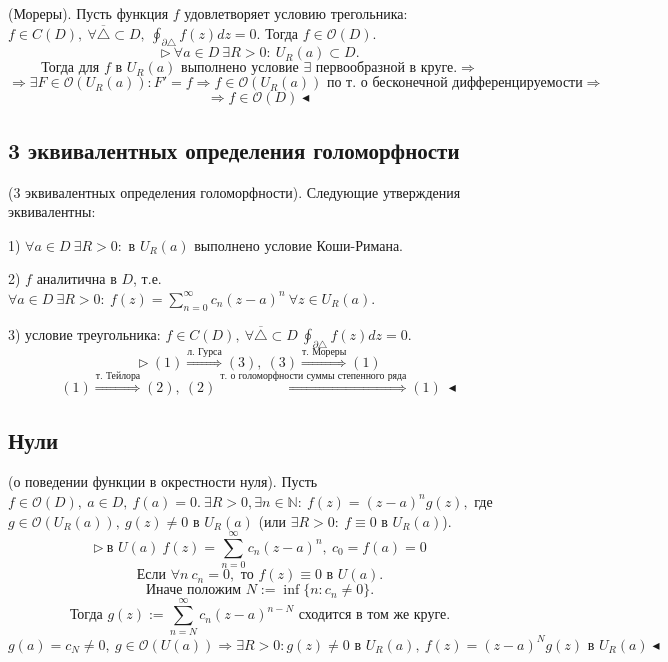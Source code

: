  (Мореры). Пусть функция $f$ удовлетворяет условию трегольника: $f \in C(D), \ \forall \overline{\triangle} \subset D, \ \oint_{\partial \triangle} f(z) dz = 0.$ Тогда $f \in \mathcal{O}(D).$
\[\triangleright \ \forall a \in D \ \exists R>0: \ U_R(a) \subset D.\] 
\[\text{Тогда для $f$ в } U_R(a) \text{ выполнено условие $\exists$ первообразной в круге.} \Rightarrow\] 
\[\Rightarrow \exists F \in \mathcal{O}(U_R(a)) : F' = f \Rightarrow f \in \mathcal{O}(U_R(a)) \text{ по т. о бесконечной дифференцируемости} \Rightarrow\]
\[\Rightarrow  f \in \mathcal{O}(D) \blacktriangleleft\]
\subsection{3 эквивалентных определения голоморфности}
 (3 эквивалентных определения голоморфности). Следующие утверждения эквивалентны:

1) $\forall a \in D \ \exists R > 0 :$ в $U_R(a)$ выполнено условие Коши-Римана.

2) $f$ аналитична в $D$, т.е. $\forall a \in D \ \exists R > 0: \ f(z) = \sum_{n=0}^\infty c_n(z-a)^n \ \forall z \in U_R(a)$.

3) условие треугольника: $f \in C(D), \ \forall \overline{\triangle} \subset D \ \oint_{\partial \triangle} f(z) dz = 0.$
\[\triangleright \ (1) \overset{\text{л. Гурса}}{\Rightarrow} (3), \ (3) \overset{\text{т. Мореры}}{\Rightarrow} (1)\]
\[(1) \overset{\text{т. Тейлора}}{\Rightarrow} (2), \ (2) \overset{\text{т. о голоморфности суммы степенного ряда}}{\Rightarrow} (1) \ \blacktriangleleft\]

\subsection{Нули}
 (о поведении функции в окрестности нуля). Пусть $f \in \mathcal{O}(D), \ a \in D, \ f(a) = 0. \ \exists R>0, \exists n \in \mathbb{N} : \ f(z) = (z-a)^n g(z),$ где $g \in \mathcal{O}(U_R(a)), \ g(z) \neq 0$ в $U_R(a)$ (или $\exists R> 0: \ f \equiv 0$ в $U_R(a)$).
\[\triangleright \ \text{в } U(a) \ f(z) = \sum_{n=0}^\infty c_n (z-a)^n, \ c_0 = f(a) = 0\]
\[\text{Если } \forall n \ c_n =0, \text{ то } f(z) \equiv 0 \text{ в } U(a).\] 
\[\text{Иначе положим } N := \inf \{n: c_n \neq 0\}.\] 
\[\text{Тогда } g(z) := \sum_{n = N}^\infty c_n (z-a)^{n-N} \text{ сходится в том же круге.}\]
\[g(a) = c_N \neq 0, \ g \in \mathcal{O}(U(a)) \Rightarrow \exists R>0: g(z) \neq 0 \text{ в } U_R(a), \ f(z) = (z-a)^N g(z) \text{ в } U_R(a) \blacktriangleleft\]

